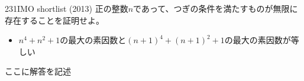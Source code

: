 \begin{prob}{231}{}{IMO shortlist (2013)}
 正の整数$n$であって、つぎの条件を満たすものが無限に存在することを証明せよ。
 \begin{itemize}
  \item[条件:] $n^4+n^2+1$の最大の素因数と$(n+1)^4+(n+1)^2+1$の最大の素因数が等しい 
 \end{itemize}
\end{prob}
ここに解答を記述